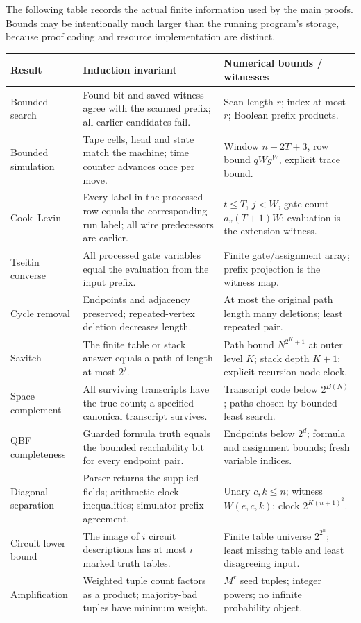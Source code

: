 The following table records the actual finite information used by the main
proofs. Bounds may be intentionally much larger than the running program's
storage, because proof coding and resource implementation are distinct.

\begin{longtable}{@{}>{\RaggedRight\arraybackslash}p{}>{\RaggedRight\arraybackslash}p{}>{\RaggedRight\arraybackslash}p{}@{}}
\toprule
Result & Induction invariant & Numerical bounds / witnesses\\
\midrule
\endhead
Bounded search & Found-bit and saved witness agree with the scanned prefix;
all earlier candidates fail. & Scan length \(r\); index at most \(r\);
Boolean prefix products.\\
Bounded simulation & Tape cells, head and state match the machine; time
counter advances once per move. & Window \(n+2T+3\), row bound
\(qWg^W\), explicit trace bound.\\
Cook--Levin & Every label in the processed row equals the corresponding
run label; all wire predecessors are earlier. & \(t\le T\), \(j<W\),
gate count \(a_v(T+1)W\); evaluation is the extension witness.\\
Tseitin converse & All processed gate variables equal the evaluation
from the input prefix. & Finite gate/assignment array; prefix projection
is the witness map.\\
Cycle removal & Endpoints and adjacency preserved; repeated-vertex
deletion decreases length. & At most the original path length many
deletions; least repeated pair.\\
Savitch & The finite table or stack answer equals a path of length
at most \(2^j\). & Path bound \(N^{2^K+1}\) at outer level \(K\);
stack depth \(K+1\); explicit recursion-node clock.\\
Space complement & All surviving transcripts have the true count; a
specified canonical transcript survives. & Transcript code below
\(2^{B(N)}\); paths chosen by bounded least search.\\
QBF completeness & Guarded formula truth equals the bounded reachability
bit for every endpoint pair. & Endpoints below \(2^d\); formula and
assignment bounds; fresh variable indices.\\
Diagonal separation & Parser returns the supplied fields; arithmetic
clock inequalities; simulator-prefix agreement. & Unary \(c,k\le n\);
witness \(W(e,c,k)\); clock \(2^{K(n+1)^2}\).\\
Circuit lower bound & The image of \(i\) circuit descriptions has at most
\(i\) marked truth tables. & Finite table universe \(2^{2^n}\); least
missing table and least disagreeing input.\\
Amplification & Weighted tuple count factors as a product; majority-bad
tuples have minimum weight. & \(M^r\) seed tuples; integer powers;
no infinite probability object.\\
\bottomrule
\end{longtable}

